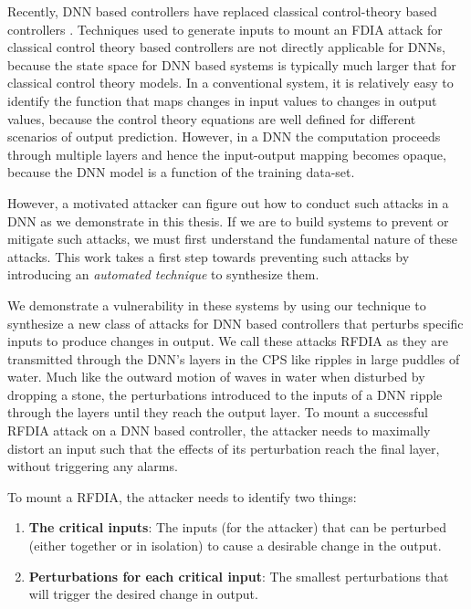 Recently,  \ac{DNN} based controllers have replaced classical control-theory based controllers \cite{xiang18} \cite{Kocic2019} \cite{bechtel2017deeppicar}.  
Techniques used to generate inputs to mount an FDIA attack for classical control theory based controllers are not directly applicable for DNNs, because the state space for DNN based systems is typically much larger that for classical control theory models. 
In a conventional system, it is relatively easy to identify the function that maps changes in input values to changes in output values, because the control theory equations are well defined for different scenarios of output prediction.
However, in a \ac{DNN} the computation proceeds through multiple layers and hence the input-output mapping becomes opaque, because the \ac{DNN} model is a function of the training data-set.

However, a motivated attacker can figure out how to conduct such attacks in a \ac{DNN} as we demonstrate in this thesis. 
If we are to build systems to prevent or mitigate such attacks, we must first understand the fundamental nature of these attacks. 
This work takes a first step towards preventing such attacks by introducing an {\em automated technique} to synthesize them. 

We demonstrate a vulnerability in these systems by using our technique to synthesize a new class of attacks for DNN based controllers that perturbs specific inputs to produce changes in output. 
We call these attacks \ac{RFDIA} as they are transmitted through the DNN's layers in the CPS like ripples in large puddles of water. 
Much like the outward motion of waves in water when disturbed by dropping a stone, the perturbations introduced to the inputs of a DNN ripple through the layers until they reach the output layer. 
To mount a successful \ac{RFDIA} attack on a DNN based controller, the attacker needs to maximally distort an input such that the effects of its perturbation reach the final layer, without triggering any alarms. 

To mount a \ac{RFDIA}, the attacker needs to identify two things: 
\begin{enumerate}
	\item \textbf{The critical inputs}: The inputs (for the attacker) that can be perturbed (either together or in isolation) to cause a desirable change in the output.
	\item \textbf{Perturbations for each critical input}: The smallest perturbations that will trigger the desired change in output. 
\end{enumerate}


